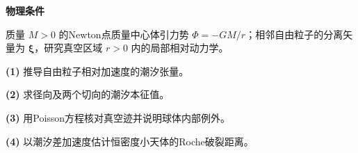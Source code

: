 \textbf{物理条件}\par 质量 \(M>0\) 的Newton点质量中心体引力势 \(\Phi=-GM/r\)；相邻自由粒子的分离矢量为 \(\boldsymbol\xi\)，研究真空区域 \(r>0\) 内的局部相对动力学。
\par\noindent\textbf{(1)} 推导自由粒子相对加速度的潮汐张量。
\par\noindent\textbf{(2)} 求径向及两个切向的潮汐本征值。
\par\noindent\textbf{(3)} 用Poisson方程核对真空迹并说明球体内部例外。
\par\noindent\textbf{(4)} 以潮汐差加速度估计恒密度小天体的Roche破裂距离。
